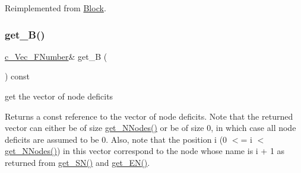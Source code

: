 Reimplemented from \mbox{\hyperlink{class_s_m_spp__di__unipi__it_1_1_block_acd79fd0980af547f2f06241cb989094e}{Block}}.

\mbox{\label{class_s_m_spp__di__unipi__it_1_1_m_c_f_block_a7023cfc72d9fa95a2aa002a2abca390e}} 
\subsubsection{\texorpdfstring{get\+\_\+\+B()}{get\_B()}\hspace{0.1cm}{\footnotesize\ttfamily [1/2]}}
{\footnotesize\ttfamily \mbox{\hyperlink{class_s_m_spp__di__unipi__it_1_1_m_c_f_block_ae74990406673bbcdf64e1a3e3b680d5c}{c\+\_\+\+Vec\+\_\+\+F\+Number}}\& get\+\_\+B (\begin{DoxyParamCaption}\item[{void}]{ }\end{DoxyParamCaption}) const\hspace{0.3cm}{\ttfamily [inline]}}



get the vector of node deficits 

Returns a const reference to the vector of node deficits. Note that the returned vector can either be of size \mbox{\hyperlink{class_s_m_spp__di__unipi__it_1_1_m_c_f_block_afff9080606a5612d33ba20c39d663839}{get\+\_\+\+N\+Nodes()}} or be of size 0, in which case all node deficits are assumed to be 0. Also, note that the position i (0 $<$= i $<$ \mbox{\hyperlink{class_s_m_spp__di__unipi__it_1_1_m_c_f_block_afff9080606a5612d33ba20c39d663839}{get\+\_\+\+N\+Nodes()}}) in this vector correspond to the node whose name is i + 1 as returned from \mbox{\hyperlink{class_s_m_spp__di__unipi__it_1_1_m_c_f_block_a48ce277b5dac05d54aa2281fa4595c7b}{get\+\_\+\+S\+N()}} and \mbox{\hyperlink{class_s_m_spp__di__unipi__it_1_1_m_c_f_block_a34619412f7c801aadfa0b083a6efda36}{get\+\_\+\+E\+N()}}. \mbox{\label{class_s_m_spp__di__unipi__it_1_1_m_c_f_block_a1e467673e30479a02c09ca7f5c9dc925}} 
